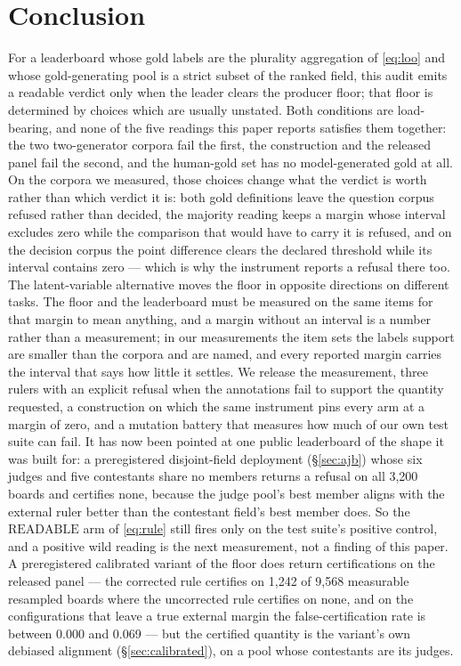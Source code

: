 \documentclass{article}
\begin{document}
\section{Conclusion} For a leaderboard whose gold labels are the plurality aggregation of \eqref{eq:loo} and whose gold-generating pool is a strict subset of the ranked field, this audit emits a readable verdict only when the leader clears the producer floor; that floor is determined by choices which are usually unstated. Both conditions are load-bearing, and none of the five readings this paper reports satisfies them together: the two two-generator corpora fail the first, the construction and the released panel fail the second, and the human-gold set has no model-generated gold at all. On the corpora we measured, those choices change what the verdict is worth rather than which verdict it is: both gold definitions leave the question corpus refused rather than decided, the majority reading keeps a margin whose interval excludes zero while the comparison that would have to carry it is refused, and on the decision corpus the point difference clears the declared threshold while its interval contains zero --- which is why the instrument reports a refusal there too. The latent-variable alternative moves the floor in opposite directions on different tasks. The floor and the leaderboard must be measured on the same items for that margin to mean anything, and a margin without an interval is a number rather than a measurement; in our measurements the item sets the labels support are smaller than the corpora and are named, and every reported margin carries the interval that says how little it settles. We release the measurement, three rulers with an explicit refusal when the annotations fail to support the quantity requested, a construction on which the same instrument pins every arm at a margin of zero, and a mutation battery that measures how much of our own test suite can fail. It has now been pointed at one public leaderboard of the shape it was built for: a preregistered disjoint-field deployment (\S\ref{sec:ajb}) whose six judges and five contestants share no members returns a refusal on all 3,200 boards and certifies none, because the judge pool's best member aligns with the external ruler better than the contestant field's best member does. So the $\mathrm{READABLE}$ arm of \eqref{eq:rule} still fires only on the test suite's positive control, and a positive wild reading is the next measurement, not a finding of this paper. A preregistered calibrated variant of the floor does return certifications on the released panel --- the corrected rule certifies on 1,242 of 9,568 measurable resampled boards where the uncorrected rule certifies on none, and on the configurations that leave a true external margin the false-certification rate is between 0.000 and 0.069 --- but the certified quantity is the variant's own debiased alignment (\S\ref{sec:calibrated}), on a pool whose contestants are its judges. %
\end{document}

